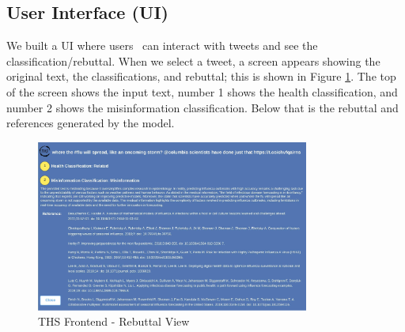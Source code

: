 \subsection{User Interface (UI)}
We built a UI where users  can interact with tweets and see the classification/rebuttal. When we select a tweet, a screen appears showing the original text, the classifications, and rebuttal; this is shown in Figure \ref{fig:frontendrebuttal}. The top of the screen shows the input text, number 1 shows the health classification, and number 2 shows the misinformation classification. Below that is the rebuttal and references generated by the model. 
\begin{figure}[!htb]
	\begin{center}
		\includegraphics[width=0.8\textwidth]{figures/THS_Rebuttal_view.jpeg} 
	\end{center}
	\caption{THS Frontend  - Rebuttal View} 
	\label{fig:frontendrebuttal}
\end{figure}






